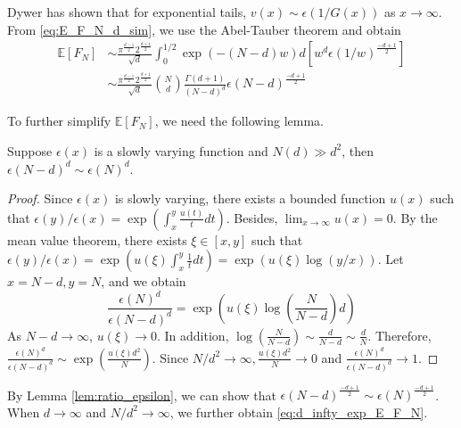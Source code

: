 \documentclass{aptpub}
\def\E{\mathbb{E}}
\begin{document}
Dywer \cite{dwyer1991convex} has shown that for exponential tails, $v(x) \sim \epsilon(1/G(x))$ as $x\to \infty$.
From \eqref{eq:E_F_N_d_sim},
we use the Abel-Tauber theorem
\cite{omey1989abelian} and obtain
\begin{align*}
    \E[F_N] & \sim \frac{\pi^{\frac{d-1}{2}} 2^{\frac{d+1}{2}}}{\sqrt{d}}\int_0^{1/2} \exp(-(N-d)w) d[w^d \epsilon(1/w)^{\frac{-d+1}{2}}] \\
    &\sim \frac{\pi^{\frac{d-1}{2}} 2^{\frac{d+1}{2}}}{\sqrt{d}} \binom{N}{d}\frac{\Gamma(d+1)}{(N-d)^d} \epsilon(N-d)^{\frac{-d+1}{2}}
\end{align*}

To further simplify $\E[F_N]$, we need the following lemma.
\begin{lemma}\label{lem:ratio_epsilon}
     Suppose $\epsilon(x)$ is a slowly varying function
     and $N(d)\gg d^2$,
     then $\epsilon(N-d)^{d} \sim \epsilon(N)^d$.
\end{lemma}
\begin{proof}
     Since $\epsilon(x)$ is slowly varying, there exists
     a bounded function $u(x)$ such that
     $\epsilon(y)/\epsilon(x)=\exp(\int_{x}^y \frac{u(t)}{t}dt)$.
     Besides, $\lim_{x\to \infty} u(x) = 0$.
     By the mean value theorem, there exists $\xi \in [x,y]$ such that
     $\epsilon(y)/\epsilon(x)=\exp(u(\xi)\int_{x}^y \frac{1}{t}dt)
     =\exp(u(\xi)\log(y/x))$. Let $x=N-d, y=N$, and we obtain
     \begin{equation*}
          \frac{\epsilon(N)^d}{\epsilon(N-d)^d}
          = \exp \left(u(\xi) \log\left(\frac{N}{N-d} \right)d \right)
     \end{equation*}
     As $N-d\to \infty$, $u(\xi)\to 0$. In addition,
     $\log(\frac{N}{N-d}) \sim \frac{d}{N-d} \sim \frac{d}{N}$.
     Therefore,
     $\frac{\epsilon(N)^d}{\epsilon(N-d)^d}\sim \exp(\frac{u(\xi)d^2}{N})
     $. Since $N/d^2 \to \infty, \frac{u(\xi)d^2}{N} \to 0$ and
     $\frac{\epsilon(N)^d}{\epsilon(N-d)^d}\to 1$.
\end{proof}
By Lemma \ref{lem:ratio_epsilon}, we can show that
$\epsilon(N-d)^{\frac{-d+1}{2}}\sim \epsilon(N)^{\frac{-d+1}{2}}$.
When $d\to\infty$ and $N/d^2\to \infty$, we further obtain \eqref{eq:d_infty_exp_E_F_N}.
 
\end{document}
